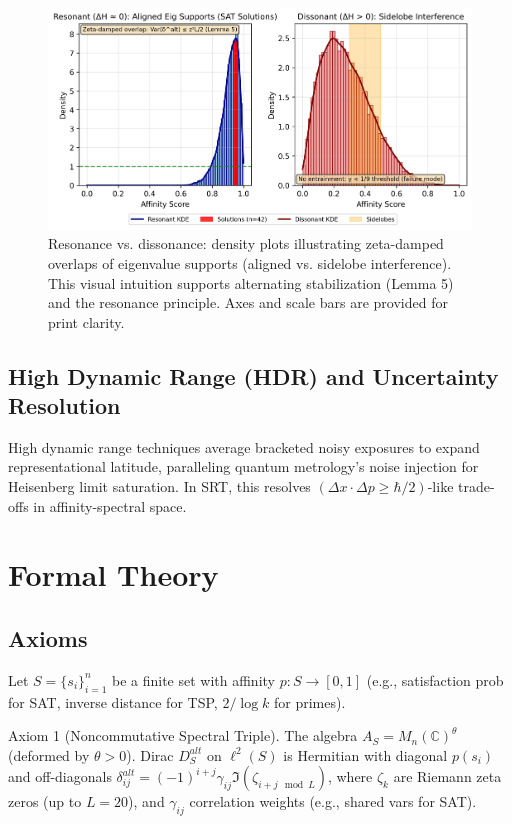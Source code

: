 \documentclass{article}
\begin{document}
\begin{figure}[H]
\centering
\includegraphics[width=\textwidth]{figure1.png}
\caption{Resonance vs. dissonance: density plots illustrating zeta-damped overlaps of eigenvalue supports (aligned vs. sidelobe interference). This visual intuition supports alternating stabilization (Lemma 5) and the resonance principle. Axes and scale bars are provided for print clarity.}
\label{fig:resonance}
\end{figure}

\subsection{High Dynamic Range (HDR) and Uncertainty Resolution}

High dynamic range techniques average bracketed noisy exposures to expand representational latitude, paralleling quantum metrology's noise injection for Heisenberg limit saturation. In SRT, this resolves $(\Delta x \cdot \Delta p \geq \hbar/2)$-like trade-offs in affinity-spectral space.

\section{Formal Theory}

\subsection{Axioms}

Let $S = \{s_i\}_{i=1}^n$ be a finite set with affinity $p: S \rightarrow [0,1]$ (e.g., satisfaction prob for SAT, inverse distance for TSP, $2/\log k$ for primes).

Axiom 1 (Noncommutative Spectral Triple). The algebra $A_S = M_n(\mathbb{C})^\theta$ (deformed by $\theta > 0$). Dirac $D_S^{alt}$ on $\ell^2(S)$ is Hermitian with diagonal $p(s_i)$ and off-diagonals $\delta_{ij}^{alt} = (-1)^{i+j} \gamma_{ij} \Im(\zeta_{i+j \mod L})$, where $\zeta_k$ are Riemann zeta zeros (up to $L=20$), and $\gamma_{ij}$ correlation weights (e.g., shared vars for SAT).
\end{document}
